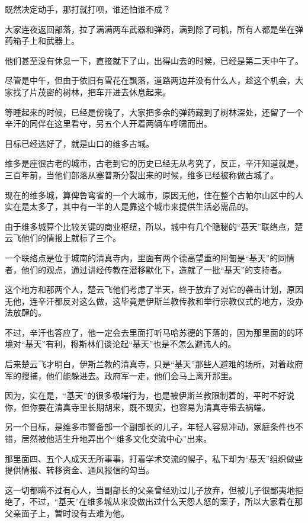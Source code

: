 既然决定动手，那打就打呗，谁还怕谁不成？

大家连夜返回部落，拉了满满两车武器和弹药，满到除了司机，所有人都是坐在弹药箱子上和武器上。

他们甚至没有休息一下，直接就下了山，出得山去的时候，已经是第二天中午了。

尽管是中午，但由于依旧有雪花在飘落，道路两边并没有什么人，趁这个机会，大家找了片茂密的树林，把车开进去休息起来。

等睡起来的时候，已经是傍晚了，大家把多余的弹药藏到了树林深处，还留了一个辛汗的同伴在这里看守，另五个人开着两辆车呼啸而出。

目标已经选好了，就是山口的维多古城。

维多是座很古老的城市，古老到它的历史已经无从考究了，反正，辛汗知道就是，三百年前，当他们部落从塞普斯分裂出来的时候，维多已经被称做古城了。

现在的维多城，算俾鲁弯省的一个大城市，原因无他，住在整个古帕尔山区中的人实在是太多了，其中有一半的人是靠这个城市来提供生活必需品的。

由于维多城算个比较关键的商业枢纽，所以，城中有几个隐秘的“基天”联络点，楚云飞他们的情报上就标了三个。

一个联络点是位于城南的清真寺内，里面有两个德高望重的阿訇是“基天”的同情者，他们的观点，通过讲经传教在潜移默化下，造就了一批“基天”的支持者。

这个地方和那两个人，楚云飞他们考虑了半天，终于放弃了对它的袭击计划，原因无他，连辛汗都反对这么做，这毕竟是伊斯兰教传教和举行宗教仪式的地方，没办法放肆的。

不过，辛汗也答应了，他一定会去里面打听马哈苏德的下落的，因为那里面的的环境对“基天”有利，穆斯林们谈论起“基天”也是不怎么避讳人的。

后来楚云飞才明白，伊斯兰教的清真寺，只是“基天”那些人避难的场所，对着政府军的搜捕，他们能躲进去。政府军一走，他们会马上离开那里。

因为，实在是，“基天”的很多极端行为，也是被伊斯兰教限制着的，平时不好说你，但你要在清真寺里长期胡来，既不现实，也容易为清真寺带去祸端。

另一个目标，是维多市警备部一个副部长的儿子，年轻人容易冲动，家庭条件也不错，居然被他活生升地弄出个“维多文化交流中心”出来。

那里面四、五个人成天无所事事，打着学术交流的幌子，私下却为“基天”组织做些提供情报、转移资金、通风报信的勾当。

这一切都瞒不过有心人，当副部长的父亲曾经劝过儿子放弃，但被儿子很鄙夷地拒绝了，不过，“基天”在维多城从来没做出过什么天怨人怒的案子，所以大家看在那父亲面子上，暂时没有去难为他。


